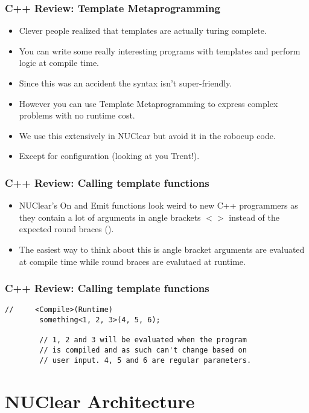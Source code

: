 \documentclass{beamer}
\begin{document}
\begin{frame}
	\frametitle{C++ Review: Template Metaprogramming}
	\begin{itemize}
		\item Clever people realized that templates are actually turing complete.
		\item You can write some really interesting programs with templates and perform logic at compile time.
		\item Since this was an accident the syntax isn't super-friendly.
		\item However you can use Template Metaprogramming to express complex problems with no runtime cost.
		\item We use this extensively in NUClear but avoid it in the robocup code.
		\item Except for configuration (looking at you Trent!).
	\end{itemize}
\end{frame}

\begin{frame}
	\frametitle{C++ Review: Calling template functions}
	\begin{itemize}
		\item NUClear's On and Emit functions look weird to new C++ programmers as they contain a lot of arguments in angle brackets 
			$<>$ instead of the expected round braces ().
		\item The easiest way to think about this is angle bracket arguments are evaluated at compile time while round braces are
			evalutaed at runtime. 
	\end{itemize}
\end{frame}

\begin{frame}[fragile]
	\frametitle{C++ Review: Calling template functions}
	\begin{lstlisting}[language=nuclear]
		//	   <Compile>(Runtime)
		something<1, 2, 3>(4, 5, 6);

		// 1, 2 and 3 will be evaluated when the program 
		// is compiled and as such can't change based on
		// user input. 4, 5 and 6 are regular parameters.
	\end{lstlisting}
\end{frame}

\section{NUClear Architecture}
\end{document}
